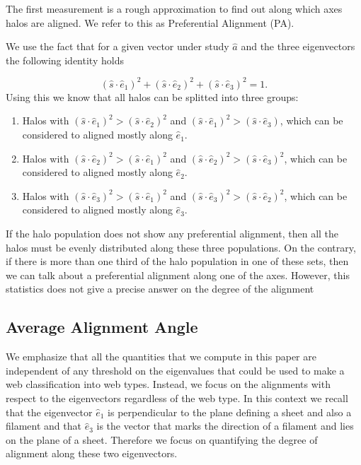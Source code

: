 \documentclass[useAMS,usenatbib]{mn2e}
\begin{document}
The first measurement is a rough approximation to find out along which
axes halos are aligned. We refer to this as Preferential Alignment (PA).

We use the fact that for a given vector under study $\hat{a}$ and the
three eigenvectors the following identity holds 
 
\begin{equation}
(\hat{s}\cdot\hat{e}_1)^2 +(\hat{s}\cdot\hat{e}_2)^2 +(\hat{s}\cdot\hat{e}_3)^2 =1.
\end{equation}
%
Using this we know that all halos can be splitted into three groups:

\begin{enumerate}
\item Halos with $(\hat{s}\cdot\hat{e}_1)^2> (\hat{s}\cdot\hat{e}_2)^2$
  and $(\hat{s}\cdot\hat{e}_1)^2> (\hat{s}\cdot\hat{e}_3)$, which can
  be considered to aligned mostly along $\hat{e}_1$.
\item Halos with $(\hat{s}\cdot\hat{e}_2)^2> (\hat{s}\cdot\hat{e}_1)^2$
  and $(\hat{s}\cdot\hat{e}_2)^2> (\hat{s}\cdot\hat{e}_3)^2$, which can
  be considered to aligned mostly along $\hat{e}_2$.
\item Halos with $(\hat{s}\cdot\hat{e}_3)^2> (\hat{s}\cdot\hat{e}_1)^2$
  and $(\hat{s}\cdot\hat{e}_3)^2> (\hat{s}\cdot\hat{e}_2)^2$, which can
  be considered to aligned mostly along $\hat{e}_3$.
\end{enumerate}

If the halo population does not show any preferential alignment, then
all the halos must be evenly distributed along these three
populations. On the contrary, if there is more than one third of the
halo population in one of these sets, then we can talk about a
preferential alignment along one of the axes. However, this statistics
does not give a precise answer on the degree of the alignment


\subsection{Average Alignment Angle}

We emphasize that all the quantities that we compute in this paper are
independent of any threshold on the eigenvalues that could be used to make a web
classification into web types. Instead, we focus on the alignments with
respect to the eigenvectors regardless of the web type. In this
context we recall that the eigenvector $\hat{e}_1$ is 
perpendicular to the plane defining a sheet and also a filament and
that $\hat{e}_3$ is the vector that marks the direction of a filament
and lies on the plane of a sheet. Therefore we focus on quantifying
the degree of alignment along these two eigenvectors.
\end{document}
